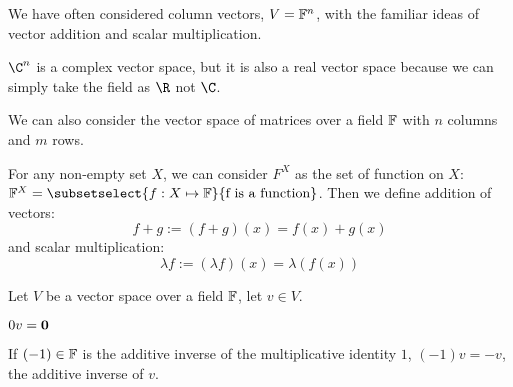 \documentclass[../Main.tex]{subfiles}
\begin{document}
\begin{example}
    We have often considered column vectors, $V = \mathbb{F}^n$, with the familiar ideas of vector addition and scalar multiplication.

    $\C^n$ is a complex vector space, but it is also a real vector space because we can simply take the field as $\R$ not $\C$.
\end{example}
\begin{example}
    We can also consider the vector space of matrices over a field $\mathbb{F}$ with $n$ columns and $m$ rows.
\end{example}
\begin{example}
    For any non-empty set $X$, we can consider $F^X$ as the set of function on $X$:
    $\F^X = \subsetselect{f : X \mapsto \F}{\text{f is a function}}$. Then we define addition of vectors:
    \begin{equation*}
        f+g := (f + g)(x) = f(x) + g(x)
    \end{equation*}
    and scalar multiplication:
    \begin{equation*}
        \lambda f := (\lambda f)(x) = \lambda (f(x))
    \end{equation*}
\end{example}
\begin{propositions}{
        Let $V$ be a vector space over a field $\mathbb{F}$, let $v \in V$.
    }
    \item $0v = \boldsymbol{0}$ \label{propZeroVector}
    \item If $(-1) \in \mathbb{F}$ is the additive inverse of the multiplicative identity $1$, $(-1)v = -v$, the additive inverse of $v$. \label{propNegativeVector}
    \label{propsSpecialVectors}
\end{propositions}
\end{document}
